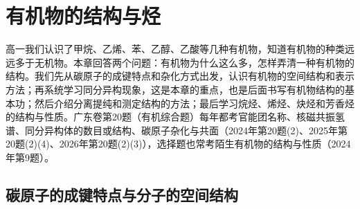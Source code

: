 \newcommand{\cninebenz}[3][0.5]{%
  \draw[c9bond] (90:#1) \foreach \k in {1,...,5}{ -- ({90-60*\k}:#1)} -- cycle;
  \draw[c9bond] (0,0) circle ({0.6*#1});
  \foreach \p/\t in {#2}{%
    \pgfmathtruncatemacro\cnineang{150-60*\p}%
    \pgfmathtruncatemacro\cnineanc{mod(\cnineang+540,360)}%
    \draw[c9bond] (\cnineang:#1) -- (\cnineang:{1.5*#1}) node[c9atom,anchor=\cnineanc]{\t};}
  \foreach \p/\t in {#3}{\node[c9mk] at ({150-60*\p}:{1.4*#1}) {\t};}
}
\newcommand{\cninewedge}[2]{\fill ($(#1)!0.22cm!(#2)$) -- ($($(#2)!0.22cm!(#1)$)!0.07cm!90:(#1)$) -- ($($(#2)!0.22cm!(#1)$)!0.07cm!-90:(#1)$) -- cycle;}
\newcommand{\cninesk}[1]{{\setchemfig{atom sep=1.65em}\small\chemfig{#1}}}

\chapter{有机物的结构与烃}

高一我们认识了甲烷、乙烯、苯、乙醇、乙酸等几种有机物，知道有机物的种类远远多于无机物。本章回答两个问题：有机物为什么这么多，怎样弄清一种有机物的结构。我们先从碳原子的成键特点和杂化方式出发，认识有机物的空间结构和表示方法；再系统学习同分异构现象，这是本章的重点，也是后面书写有机物结构的基本功；然后介绍分离提纯和测定结构的方法；最后学习烷烃、烯烃、炔烃和芳香烃的结构与性质。广东卷第20题（有机综合题）每年都考官能团名称、核磁共振氢谱、同分异构体的数目或结构、碳原子杂化与共面（2024年第20题(2)、2025年第20题(2)(4)、2026年第20题(2)(3)），选择题也常考陌生有机物的结构与性质（2024年第9题）。

\section{碳原子的成键特点与分子的空间结构}

